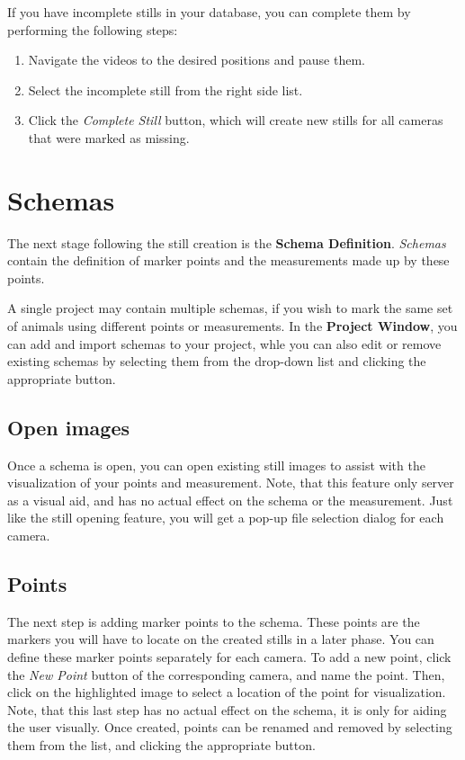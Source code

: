\documentclass[10pt,a4paper,oneside]{report}             %
\begin{document}
If you have incomplete stills in your database, you can complete them by performing the following steps:
\begin{enumerate}
	\item Navigate the videos to the desired positions  and pause them.
	\item Select the incomplete still from the right side list.
	\item Click the \textit{Complete Still} button, which will create new stills for all cameras that were marked as missing.
\end{enumerate}

\section{Schemas}

The next stage following the still creation is the \textbf{Schema Definition}. \textit{Schemas} contain the definition of marker points and the measurements made up by these points.

A single project may contain multiple schemas, if you wish to mark the same set of animals using different points or measurements. In the \textbf{Project Window}, you can add and import schemas to your project, whle you can also edit or remove existing schemas by selecting them from the drop-down list and clicking the appropriate button.

\subsection{Open images}

Once a schema is open, you can open existing still images to assist with the visualization of your points and measurement. Note, that this feature only server as a visual aid, and has no actual effect on the schema or the measurement. Just like the still opening feature, you will get a pop-up file selection dialog for each camera.

\subsection{Points}

The next step is adding marker points to the schema. These points are the markers you will have to locate on the created stills in a later phase. You can define these marker points separately for each camera. To add a new point, click the \textit{New Point} button of the corresponding camera, and name the point. Then, click on the highlighted image to select a location of the point for visualization. Note, that this last step has no actual effect on the schema, it is only for aiding the user visually. Once created, points can be renamed and removed by selecting them from the list, and clicking the appropriate button.
\end{document}
